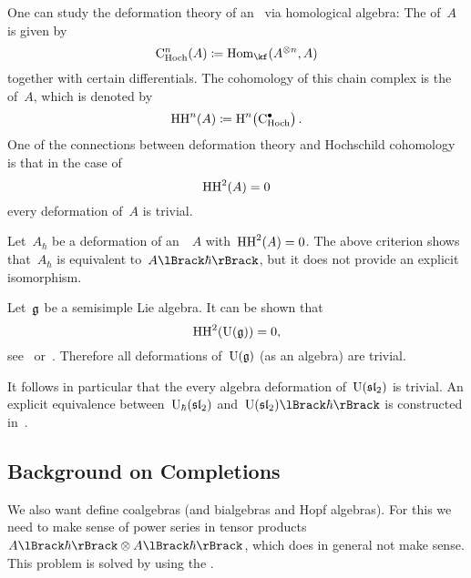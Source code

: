 \documentclass[a4paper, 11pt, oneside]{scrartcl}
\begin{document}
\begin{remark}
  One can study the deformation theory of an~\algebra{$\kf$} via homological algebra:
  The  of~$A$ is given by
  \[
    \CHoch^n(A)
    \defined
    \Hom_{\kf}(A^{\tensor n}, A)
  \]
  together with certain differentials.
  The cohomology of this chain complex is the  of~$A$, which is denoted by
  \[
    \HH^n(A)
    \defined
    \Homology^n\bigl( \CHoch^\bullet \bigr) \,.
  \]
  One of the connections between deformation theory and Hochschild cohomology is that in the case of
  \[
    \operatorname{HH}^2(A) = 0
  \]
  every deformation of~$A$ is trivial.
\end{remark}

\begin{warning}
  Let~$A_\hbar$ be a deformation of an~\algebra{$\kf$}~$A$ with~$\operatorname{HH}^2(A) = 0$.
  The above criterion shows that~$A_\hbar$ is equivalent to~$\power{A}{\hbar}$, but it does not provide an explicit isomorphism.
\end{warning}

\begin{example}
  Let~$\mathfrak{g}$ be a semisimple Lie algebra.
  It can be shown that
  \[
    \operatorname{HH}^2( \operatorname{U}(\mathfrak{g}) ) = 0,
  \]
  see~\cite[Theorem~2]{gerstenhaber_quantum} or~\cite[Exercise~2.8.1,~Bonus]{schedler_nca}.
  Therefore all deformations of~$\operatorname{U}(\mathfrak{g})$ (as an algebra) are trivial.

  It follows in particular that the every algebra deformation of~$\operatorname{U}(\mathfrak{sl}_2)$ is trivial.
  An explicit equivalence between~$\operatorname{U}_{\hbar}(\mathfrak{sl}_2)$ and~$\power{\Univ(\sllie_2)}{\hbar}$ is constructed in~\cite[Proposition~4.6.4]{guide_to_quantum_groups}.
\end{example}





\subsection{Background on Completions}

We also want define coalgebras (and bialgebras and Hopf algebras).
For this we need to make sense of power series in tensor products~$\power{A}{\hbar} \tensor \power{A}{\hbar}$, which does in general not make sense.
This problem is solved by using the .
\end{document}
